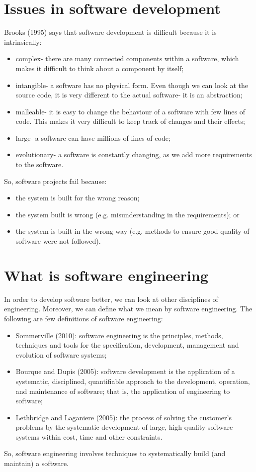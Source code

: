 \documentclass[a4paper, openany]{memoir}
\begin{document}
\section{Issues in software development}
Brooks (1995) says that software development is difficult because it is intrinsically:
\begin{itemize}
    \item complex- there are many connected components within a software, which makes it difficult to think about a component by itself;
    \item intangible- a software has no physical form. Even though we can look at the source code, it is very different to the actual software- it is an abstraction;
    \item malleable- it is easy to change the behaviour of a software with few lines of code. This makes it very difficult to keep track of changes and their effects;
    \item large- a software can have millions of lines of code;
    \item evolutionary- a software is constantly changing, as we add more requirements to the software.
\end{itemize}

So, software projects fail because:
\begin{itemize}
    \item the system is built for the wrong reason;
    \item the system built is wrong (e.g. misunderstanding in the requirements); or
    \item the system is built in the wrong way (e.g. methods to ensure good quality of software were not followed).
\end{itemize}

\section{What is software engineering}
In order to develop software better, we can look at other disciplines of engineering. Moreover, we can define what we mean by software engineering. The following are few definitions of software engineering:
\begin{itemize}
    \item Sommerville (2010): software engineering is the principles, methods, techniques and tools for the specification, development, management and evolution of software systems;
    \item Bourque and Dupis (2005): software development is the application of a systematic, disciplined, quantifiable approach to the development, operation, and maintenance of software; that is, the application of engineering to software;
    \item Lethbridge and Laganiere (2005): the process of solving the customer's problems by the systematic development of large, high-quality software systems within cost, time and other constraints.
\end{itemize}
So, software engineering involves techniques to systematically build (and maintain) a software.
\end{document}

